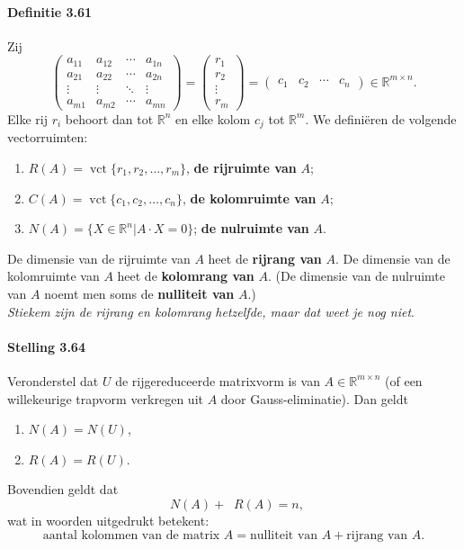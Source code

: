 \documentclass[11pt,oneside,a4paper]{article}
\DeclareMathOperator{\vct}{vct}
\DeclareMathOperator{\rdim}{dim_\mathbb{R}}
\begin{document}
	\paragraph{Definitie 3.61}
		Zij $$\begin{pmatrix}
			a_{11} & a_{12} & \cdots & a_{1n} \\
			a_{21} & a_{22} & \cdots & a_{2n} \\
			\vdots & \vdots & \ddots & \vdots \\
			a_{m1} & a_{m2} & \cdots & a_{mn} 
		\end{pmatrix} = \begin{pmatrix} r_1 \\ r_2 \\ \vdots \\ r_m \end{pmatrix} = \begin{pmatrix}
		c_1 & c_2 & \cdots &c_n
		\end{pmatrix} \in \mathbb{R}^{m\times n}.$$
		Elke rij $r_i$ behoort dan tot $\mathbb{R}^n$ en elke kolom $c_j$ tot $\mathbb{R}^m$. We definiëren de volgende vectorruimten:
		\begin{enumerate}
			\item $R(A) = \vct\{r_1,r_2,\ldots ,r_m\}$, \textbf{de rijruimte van} $A$; 
			\item $C(A) = \vct\{c_1,c_2,\ldots ,c_n\}$, \textbf{de kolomruimte van} $A$;
			\item $N(A) = \{X \in \mathbb{R}^n | A \cdot X = 0\}$; \textbf{de nulruimte van} $A$.
		\end{enumerate}
		De dimensie van de rijruimte van $A$ heet de \textbf{rijrang van} $A$. De dimensie van de kolomruimte van $A$ heet de \textbf{kolomrang van} $A$. (De dimensie van de nulruimte van $A$ noemt men soms de \textbf{nulliteit van} $A$.)
		\\ \textit{Stiekem zijn de rijrang en kolomrang hetzelfde, maar dat weet je nog niet}.
	\paragraph{Stelling 3.64}
		Veronderstel dat $U$ de rijgereduceerde matrixvorm is van $A \in \mathbb{R}^{m\times n}$ (of een willekeurige trapvorm verkregen uit $A$ door Gauss-eliminatie). Dan geldt
		\begin{enumerate}
			\item $N(A) = N(U)$,
			\item $R(A) = R(U)$.
		\end{enumerate}
		Bovendien geldt dat $$\rdim N(A) + \rdim R(A) = n,$$ wat in woorden uitgedrukt betekent: $$\text{aantal kolommen van de matrix } A = \text{nulliteit van } A + \text{rijrang van } A.$$
\end{document}

